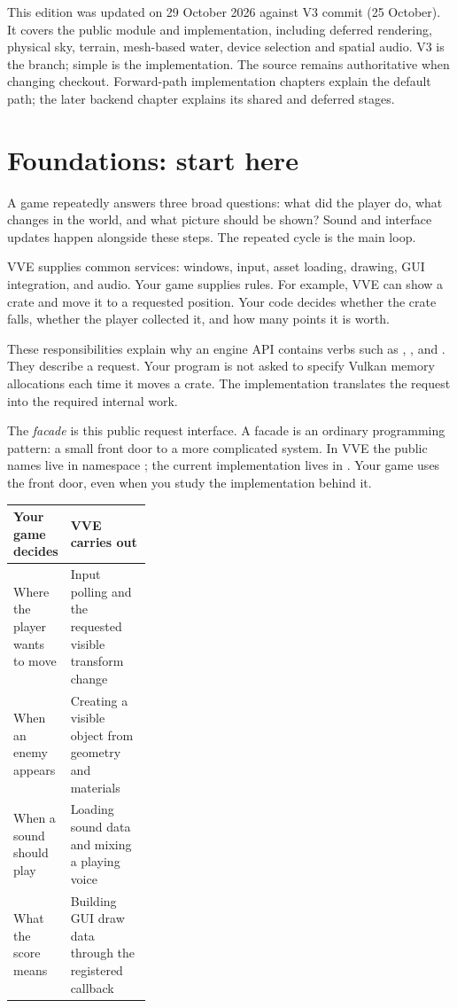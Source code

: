 \documentclass[11pt,a4paper]{article}
\begin{document}
This edition was updated on 29 October 2026 against V3 commit  (25 October). It covers the public  module and  implementation, including deferred rendering, physical sky, terrain, mesh-based water, device selection and spatial audio. V3 is the branch; simple is the implementation. The source remains authoritative when changing checkout. Forward-path implementation chapters explain the default path; the later backend chapter explains its shared and deferred stages.
\clearpage
\tableofcontents

\clearpage
\part*{Foundations: start here}

A game repeatedly answers three broad questions: what did the player do, what changes in the world, and what picture should be shown? Sound and interface updates happen alongside these steps. The repeated cycle is the main loop.

VVE supplies common services: windows, input, asset loading, drawing, GUI integration, and audio. Your game supplies rules. For example, VVE can show a crate and move it to a requested position. Your code decides whether the crate falls, whether the player collected it, and how many points it is worth.

These responsibilities explain why an engine API contains verbs such as , , and . They describe a request. Your program is not asked to specify Vulkan memory allocations each time it moves a crate. The implementation translates the request into the required internal work.

The \emph{facade} is this public request interface. A facade is an ordinary programming pattern: a small front door to a more complicated system. In VVE the public names live in namespace ; the current implementation lives in . Your game uses the front door, even when you study the implementation behind it.

\begin{tabularx}{\linewidth}{@{}p{0.31\linewidth}X@{}}
\toprule Your game decides & VVE carries out \\\midrule
Where the player wants to move & Input polling and the requested visible transform change \\
When an enemy appears & Creating a visible object from geometry and materials \\
When a sound should play & Loading sound data and mixing a playing voice \\
What the score means & Building GUI draw data through the registered callback \\
\bottomrule
\end{tabularx}
\end{document}
